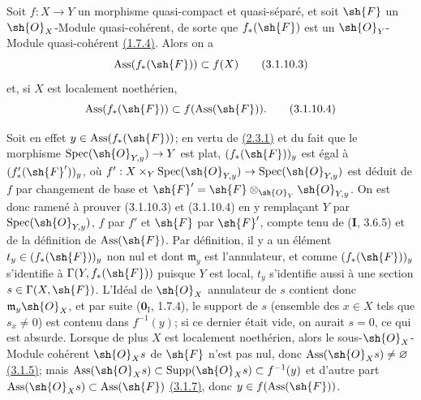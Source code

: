 \begin{remark}[3.1.10.2]
\label{IV.3.1.10.2}
Soit $f:X\to Y$ un morphisme quasi-compact et quasi-séparé, et soit
$\sh{F}$ un $\sh{O}_X$-Module quasi-cohérent, de sorte que
$f_*(\sh{F})$ est un $\sh{O}_Y$-Module quasi-cohérent
{\hyperref[canon-index.ega4.c04.statement.1-7-4]{(1.7.4)}}. Alors on a
\begin{equation}
 \operatorname{Ass}(f_*(\sh{F}))\subset f(X)
 \label{IV.3.1.10.3}\tag{3.1.10.3}
\end{equation}
et, si $X$ est localement noethérien,
\begin{equation}
 \operatorname{Ass}(f_*(\sh{F}))\subset f(\operatorname{Ass}(\sh{F})).
 \label{IV.3.1.10.4}\tag{3.1.10.4}
\end{equation}

Soit en effet $y\in\operatorname{Ass}(f_*(\sh{F}))$; en vertu de
{\hyperref[canon-index.ega4.c04.lem.2-3-1]{(2.3.1)}} et du fait que le morphisme
$\operatorname{Spec}(\sh{O}_{Y,y})\to Y$ est plat,
$(f_*(\sh{F}))_y$ est égal à $(f'_*(\sh{F}'))_y$, où
$f':X\times_Y\operatorname{Spec}(\sh{O}_{Y,y})\to\operatorname{Spec}(\sh{O}_{Y,y})$
est déduit de $f$ par changement de base et
$\sh{F}'=\sh{F}\otimes_{\sh{O}_Y}\sh{O}_{Y,y}$. On est donc ramené à
prouver (3.1.10.3) et (3.1.10.4) en y remplaçant $Y$ par
$\operatorname{Spec}(\sh{O}_{Y,y})$, $f$ par $f'$ et $\sh{F}$ par
$\sh{F}'$, compte tenu de (\textbf{I}, 3.6.5) et de la définition de
$\operatorname{Ass}(\sh{F})$.
Par définition, il y a un élément
$t_y\in(f_*(\sh{F}))_y$ non nul et dont $\mathfrak m_y$ est
l'annulateur, et comme $(f_*(\sh{F}))_y$ s'identifie à
$\Gamma(Y,f_*(\sh{F}))$ puisque $Y$ est local, $t_y$ s'identifie aussi
à une section $s\in\Gamma(X,\sh{F})$. L'Idéal de $\sh{O}_X$ annulateur
de $s$ contient donc $\mathfrak m_y\sh{O}_X$, et par suite
($\mathbf{0}_{\mathrm I}$, 1.7.4), le support de $s$ (ensemble des $x\in X$ tels que $s_x\neq0$) est contenu dans
$f^{-1}(y)$; si ce dernier était vide, on aurait $s=0$, ce qui est
absurde. Lorsque de plus $X$ est localement noethérien, alors le
sous-$\sh{O}_X$-Module cohérent $\sh{O}_Xs$ de $\sh{F}$ n'est pas nul,
donc $\operatorname{Ass}(\sh{O}_Xs)\neq\varnothing$
{\hyperref[canon-index.ega4.c04.cor.3-1-5]{(3.1.5)}}; mais
$\operatorname{Ass}(\sh{O}_Xs)\subset\operatorname{Supp}(\sh{O}_Xs)\subset f^{-1}(y)$ et d'autre part
$\operatorname{Ass}(\sh{O}_Xs)\subset\operatorname{Ass}(\sh{F})$
{\hyperref[canon-index.ega4.c04.prop.3-1-7]{(3.1.7)}}, donc
$y\in f(\operatorname{Ass}(\sh{F}))$.
\end{remark}

